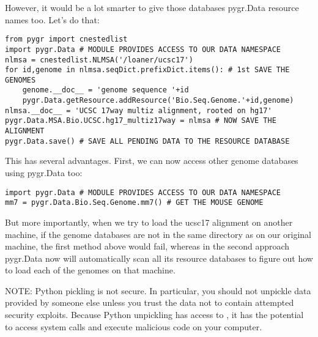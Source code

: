 \documentclass{howto}
\begin{document}
However, it would be a lot smarter to give those databases pygr.Data resource
names too.  Let's do that:
\begin{verbatim}
from pygr import cnestedlist
import pygr.Data # MODULE PROVIDES ACCESS TO OUR DATA NAMESPACE
nlmsa = cnestedlist.NLMSA('/loaner/ucsc17')
for id,genome in nlmsa.seqDict.prefixDict.items(): # 1st SAVE THE GENOMES
    genome.__doc__ = 'genome sequence '+id
    pygr.Data.getResource.addResource('Bio.Seq.Genome.'+id,genome)
nlmsa.__doc__ = 'UCSC 17way multiz alignment, rooted on hg17'
pygr.Data.MSA.Bio.UCSC.hg17_multiz17way = nlmsa # NOW SAVE THE ALIGNMENT
pygr.Data.save() # SAVE ALL PENDING DATA TO THE RESOURCE DATABASE
\end{verbatim}

This has several advantages.  First, we can now access other genome databases
using pygr.Data too:
\begin{verbatim}
import pygr.Data # MODULE PROVIDES ACCESS TO OUR DATA NAMESPACE
mm7 = pygr.Data.Bio.Seq.Genome.mm7() # GET THE MOUSE GENOME
\end{verbatim}
But more importantly, when we try to load the ucsc17 alignment on
another machine, if the genome databases are not in the same directory
as on our original machine, the first method above would fail, whereas in
the second approach pygr.Data now will automatically scan all its resource databases to
figure out how to load each of the genomes on that machine.

NOTE: Python pickling is not secure.  In particular, you should not unpickle
data provided by someone else unless you trust the data not to contain 
attempted security exploits.  Because Python unpickling has access to ,
it has the potential to access system calls and execute malicious code on your
computer.
\end{document}
